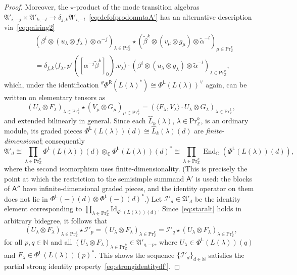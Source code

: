 \documentclass[12pt,a4paper,reqno]{amsart}
\numberwithin{equation}{section}
\theoremstyle{definition}
\newcommand{\End}{\operatorname{End}}
\newcommand{\C}{\mathbb{C}}
\newcommand{\N}{\mathbb{N}}
\newcommand{\Z}{\mathbb{Z}}
\newcommand{\I}{\mathscr{I}}
\def\L{\mathsf{L}}
\def\R{\mathsf{R}}
\def\Pr{\mathrm{Pr}}
\def\la{\lambda}
\def \al{\alpha}
\def \b{\beta}
\def\o{\otimes}
\def\ra{\rightarrow}
\def\fA{\mathfrak{A}}
\def\<{\langle}
\def\>{\rangle}
\def\Id{\mathrm{Id}}
\def\A{\mathsf{A}}
\def\fa{\mathfrak{a}}
\begin{document}
\begin{proof}
Moreover, the $\star$-product of the mode transition algebras $\fA'_{i,-j}\times \fA'_{k,-l}\ra \delta_{j,k}\fA'_{i,-l}$~\eqref{eq:defofprodonmtaA'} has an alternative description via~\eqref{eq:pairing2}
\begin{align*}
  & (\b^i\o (u_\la\o f_{\la})\o\al^{-j})_{\la\in \Pr^k_\Z}\star (\tilde{\b}^k\o (v_\mu\o g_{\mu})\o \tilde{\al}^{-l})_{\mu\in \Pr^k_\Z}\\
  &=\delta_{j,k}\<f_{\la},p'([\al^{-j}\tilde{\b}^k]_0).v_{\la}\>\cdot (\b^i\o (u_\la\o g_\la) \o \tilde{\al}^{-l})_{\la\in \Pr^k_\Z},
\end{align*}
which, under the identification ${}^\theta\Phi^\R(L(\la)^\ast)\cong  \Phi^\L(L(\la))^\vee$ again, can be written on elementary tensors as
\begin{equation}\label{eq:staralt}
    (U_\la\o F_{\la})_{\la\in \Pr^k_\Z}\star (V_\mu\o G_{\mu})_{\mu\in \Pr^k_\Z}=\left(\<F_\la,V_\la\> \cdot U_\la\o G_\la\right)_{\la\in \Pr^k_\Z},
\end{equation}
and extended bilinearly in general.
Since each $\hat{L}_k(\la)$, $\la\in\Pr^k_\Z$, is an ordinary module, its graded pieces $\Phi^\L(L(\la))(d)\cong \hat{L}_k(\la)(d)$ are \emph{finite-dimensional}; consequently
\[
\fA'_d\cong \prod_{\la\in\Pr^k_\Z}  \Phi^\L(L(\la))(d)\otimes_\C \Phi^\L(L(\la))(d)^\ast\cong  \prod_{\la\in\Pr^k_\Z} \End_\C\left(\Phi^\L(L(\la))(d)\right),
\]
where the second isomorphism uses finite-dimensionality. (This is precisely the point at which the restriction to the semisimple summand $\A'$ is used: the blocks of $\A''$ have infinite-dimensional graded pieces, and the identity operator on them does not lie in $\Phi^\L(-)(d)\o \Phi^\L(-)(d)^\ast$.)
Let $\I'_d\in \fA'_d$ be the identity element corresponding to $\prod_{\la\in \Pr^k_\Z} \Id_{\Phi^\L(L(\la))(d)}$. Since~\eqref{eq:staralt} holds in arbitrary bidegree, it follows that
\[
 (U_\la\o F_{\la})_{\la\in \Pr^k_\Z}\star \I'_p= (U_\la\o F_{\la})_{\la\in \Pr^k_\Z}=\I'_q\star  (U_\la\o F_{\la})_{\la\in \Pr^k_\Z},
\]
for all $p,q\in \N$ and all $ (U_\la\o F_{\la})_{\la\in \Pr^k_\Z}\in \fA'_{q,-p}$, where $U_\la\in  \Phi^\L(L(\la))(q)$ and $F_\la\in  \Phi^\L(L(\la))(p)^\ast$.
This shows the sequence $\{\I'_d\}_{d\in \N}$ satisfies the partial strong identity property~\eqref{eq:strongidentitydf'}.
\end{proof}

\end{document}
